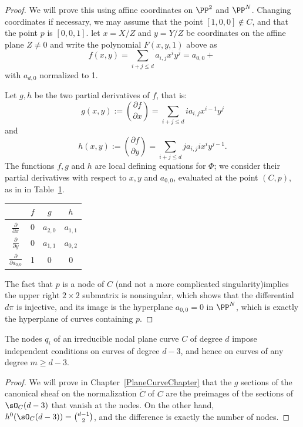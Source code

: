 \begin{proof}
We will prove this using affine coordinates on $\PP^2$ and $\PP^N$. Changing coordinates if necessary, we may assume that the point $[1,0,0] \notin C$, and that the point $p$ is $[0,0,1]$. let $x = X/Z$ and $y = Y/Z$ be coordinates on the affine plane $Z \neq 0$ and write the polynomial $F(x,y,1)$ above as
$$
f(x,y) = \sum_{i+j \leq d} a_{i,j} x^iy^j = a_{0,0} + \
$$
with $a_{d,0}$ normalized to 1. 

Let $g,h$ be the two partial derivatives of $f$, that is:
$$
g(x,y) := \binom{\partial f}{\partial x} = \sum_{i+j \leq d} i a_{i,j} x^{i-1}y^j
$$
and
$$
h(x,y) := \binom{\partial f}{\partial y} = \sum_{i+j \leq d} j a_{i,j} ix^{i}y^{j-1}.
$$
The functions $f, g$ and $h$ are local defining equations for $\Phi$; we consider their partial derivatives with respect to $x, y$ and $a_{0,0}$, evaluated at the point $(C,p)$, as in in Table~\ref{tang to Delta}.

\begin{table}[h!]\label{tang to Delta}
  \begin{center}
     \begin{tabular}{c|c|c|c} %
            & $f$ & $g$ & $h$ \\
      \hline
$\frac{\partial}{\partial x}$ & 0 & $a_{2,0}$ & $a_{1,1}$ \\
$\frac{\partial}{\partial y}$ & 0 & $a_{1,1}$ & $a_{0,2}$ \\
$\frac{\partial}{\partial a_{0,0}}$ & 1 & 0 & 0 
    \end{tabular}
  \end{center}
\end{table}

The fact that $p$ is a node of $C$ (and not a more complicated singularity)implies the upper right $2 \times 2$ submatrix is nonsingular, which shows that the differential $d\pi$ is injective, and its image is the hyperplane $a_{0,0} = 0$ in $\PP^N$, which is exactly the hyperplane of curves containing $p$.
\end{proof}

\begin{lemma}\label{adjoint independent}
The nodes $q_i$ of an irreducible nodal plane curve $C$ of degree $d$ impose independent conditions on curves of degree $d-3$, and hence on curves of any degree $m \geq d-3$.
\end{lemma}

\begin{proof}
We will prove in Chapter~\ref{PlaneCurveChapter} that the $g$ sections of the canonical sheaf on the normalization $\widetilde C$ of
$C$ are the preimages of the sections of $\sO_C(d-3)$ that vanish at the nodes. On the other hand, 
$h^0(\sO_C(d-3)) = \binom{d-1}{2}$, and the difference is exactly the number of nodes.
\end{proof}

